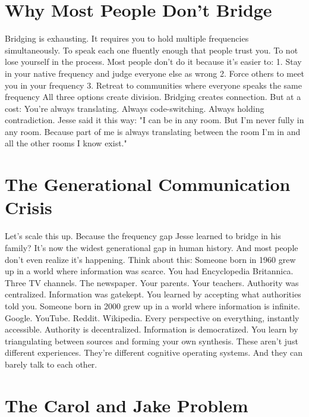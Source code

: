 \section{Why Most People Don't Bridge}

Bridging is exhausting.
It requires you to hold multiple frequencies simultaneously. To speak each one fluently enough that people trust you. To not lose yourself in the process.
Most people don't do it because it's easier to:
1. Stay in your native frequency and judge everyone else as wrong
2. Force others to meet you in your frequency
3. Retreat to communities where everyone speaks the same frequency
All three options create division.
Bridging creates connection. But at a cost: You're always translating. Always code-switching. Always holding contradiction.
Jesse said it this way: "I can be in any room. But I'm never fully in any room. Because part of me is always translating between the room I'm in and all the other rooms I know exist."

\section{The Generational Communication Crisis}

Let's scale this up.
Because the frequency gap Jesse learned to bridge in his family? It's now the widest generational gap in human history.
And most people don't even realize it's happening.
Think about this:
Someone born in 1960 grew up in a world where information was scarce. You had Encyclopedia Britannica. Three TV channels. The newspaper. Your parents. Your teachers.
Authority was centralized. Information was gatekept. You learned by accepting what authorities told you.
Someone born in 2000 grew up in a world where information is infinite. Google. YouTube. Reddit. Wikipedia. Every perspective on everything, instantly accessible.
Authority is decentralized. Information is democratized. You learn by triangulating between sources and forming your own synthesis.
These aren't just different experiences. They're different cognitive operating systems.
And they can barely talk to each other.

\section{The Carol and Jake Problem}

